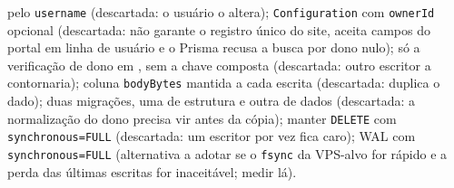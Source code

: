 { pelo  \texttt{username} (descartada: o usuário o altera); \texttt{Configuration} com \texttt{ownerId} opcional (descartada: não garante o registro único do site, aceita campos do portal em linha de usuário e o Prisma recusa a busca por dono nulo); só a verificação de dono em , sem a chave composta (descartada: outro escritor a contornaria); coluna \texttt{bodyBytes} mantida a cada escrita (descartada: duplica o dado); duas migrações, uma de estrutura e outra de dados (descartada: a normalização do dono precisa vir antes da cópia); manter \texttt{DELETE} com \texttt{synchronous=FULL} (descartada: um escritor por vez fica caro); WAL com \texttt{synchronous=FULL} (alternativa a adotar se o \texttt{fsync} da VPS-alvo for rápido e a perda das últimas escritas for inaceitável; medir lá).}

